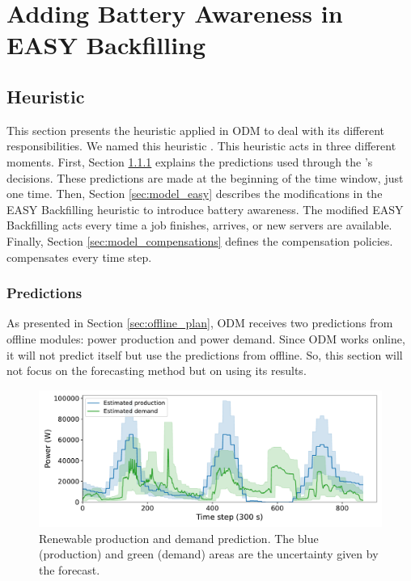 \chapter{Adding Battery Awareness in EASY Backfilling}
\label{cha:heuristic}

\minitoc

\section{Heuristic}

This section presents the heuristic applied in ODM to deal with its different responsibilities. We named this heuristic \emph{\systemName}. This heuristic acts in three different moments. First, Section \ref{sec:model_predictions} explains the predictions used through the \emph{\systemName}'s decisions. These predictions are made at the beginning of the time window, just one time. Then, Section \ref{sec:model_easy} describes the modifications in the EASY Backfilling heuristic to introduce battery awareness. The modified EASY Backfilling acts every time a job finishes, arrives, or new servers are available. Finally, Section \ref{sec:model_compensations} defines the compensation policies. \emph{\systemName} compensates every time step.

\subsection{Predictions}
\label{sec:model_predictions}

As presented in Section \ref{sec:offline_plan}, ODM receives two predictions from offline modules: power production and power demand. Since ODM works online, it will not predict itself but use the predictions from offline. So, this section will not focus on the forecasting method but on using its results.

\begin{figure}[!htb]
    \centering
    \includegraphics[scale=0.5]{Images/Heuristics/predictions.pdf}
    \caption{Renewable production and demand prediction. The blue (production) and green (demand) areas are the uncertainty given by the forecast.}
    \label{fig:predictions}
\end{figure}

